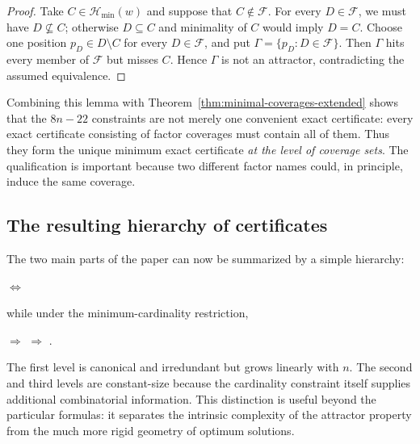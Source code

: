 \documentclass[11pt,a4paper]{article}
\theoremstyle{definition}\newtheorem{definition}[theorem]{Definition}
\theoremstyle{remark}\newtheorem{remark}[theorem]{Remark}
\newcommand{\Hmin}{\mathcal{H}_{\min}}
\begin{document}
\begin{proof}
Take $C\in\Hmin(w)$ and suppose that $C\notin\mathcal F$.  For every $D\in\mathcal F$, we must have $D\nsubseteq C$; otherwise $D\subseteq C$ and minimality of $C$ would imply $D=C$.  Choose one position
$
 p_D\in D\setminus C
$
for every $D\in\mathcal F$, and put
$
 \Gamma=\{p_D:D\in\mathcal F\}.
$
Then $\Gamma$ hits every member of $\mathcal F$ but misses $C$.  Hence $\Gamma$ is not an attractor, contradicting the assumed equivalence.
\end{proof}

Combining this lemma with Theorem~\ref{thm:minimal-coverages-extended} shows that the $8n-22$ constraints are not merely one convenient exact certificate: every exact certificate consisting of factor coverages must contain all of them.  Thus they form the unique minimum exact certificate \emph{at the level of coverage sets}.  The qualification is important because two different factor names could, in principle, induce the same coverage.

\subsection{The resulting hierarchy of certificates}
\label{subsec:certificate-hierarchy}

The two main parts of the paper can now be summarized by a simple hierarchy:
\begin{center}
$\Longleftrightarrow$
\end{center}
while under the minimum-cardinality restriction,
\begin{center}
$\Longrightarrow$
$\Longrightarrow$
.
\end{center}

The first level is canonical and irredundant but grows linearly with $n$.  The second and third levels are constant-size because the cardinality constraint itself supplies additional combinatorial information.  This distinction is useful beyond the particular formulas: it separates the intrinsic complexity of the attractor property from the much more rigid geometry of optimum solutions.





\end{document}
